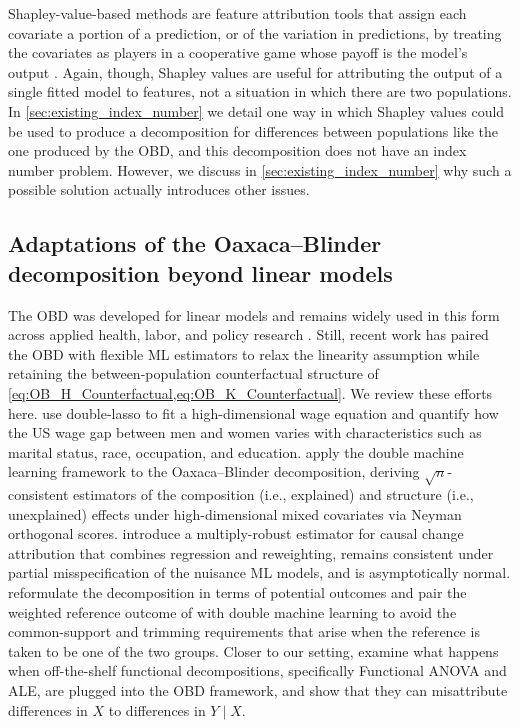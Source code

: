Shapley-value-based methods are feature attribution tools that assign each covariate a portion of a prediction, or of the variation in predictions, by treating the covariates as players in a cooperative game whose payoff is the model's output \citep{Shapley1953, Lundberg2017, chen2025shapley}.
Again, though, Shapley values are useful for attributing the output of a single fitted model to features, not a situation in which there are two populations.
In \cref{sec:existing_index_number} we detail one way in which Shapley values could be used to produce a decomposition for differences between populations like the one produced by the OBD, and this decomposition does not have an index number problem. However, we discuss in \cref{sec:existing_index_number} why such a possible solution actually introduces other issues.

\subsection{Adaptations of the Oaxaca--Blinder decomposition beyond linear models}
\label{appendix:obd_generalized}

The OBD was developed for linear models \citep{oaxaca1973, blinder1973} and remains widely used in this form across applied health, labor, and policy research \citep{paradaContzen2025, barhaim2023, cartwright2021}.
Still, recent work has paired the OBD with flexible ML estimators to relax the linearity assumption while retaining the between-population counterfactual structure of \cref{eq:OB_H_Counterfactual,eq:OB_K_Counterfactual}.
We review these efforts here.
\citet{bach2024heterogeneity} use double-lasso to fit a high-dimensional wage equation and quantify how the US wage gap between men and women varies with characteristics such as marital status, race, occupation, and education.
\citet{mao2025double} apply the double machine learning framework to the Oaxaca--Blinder decomposition, deriving $\sqrt{n}$-consistent estimators of the composition (i.e., explained) and structure (i.e., unexplained) effects under high-dimensional mixed covariates via Neyman orthogonal scores.
\citet{quintas2024multiply} introduce a multiply-robust estimator for causal change attribution that combines regression and reweighting, remains consistent under partial misspecification of the nuisance ML models, and is asymptotically normal.
\citet{flachaire2025decomposing} reformulate the decomposition in terms of potential outcomes and pair the weighted reference outcome of \citet{neumark1988} with double machine learning to avoid the common-support and trimming requirements that arise when the reference is taken to be one of the two groups.
Closer to our setting, \citet{quintero2025} examine what happens when off-the-shelf functional decompositions, specifically Functional ANOVA and ALE, are plugged into the OBD framework, and show that they can misattribute differences in $X$ to differences in $Y \mid X$.

